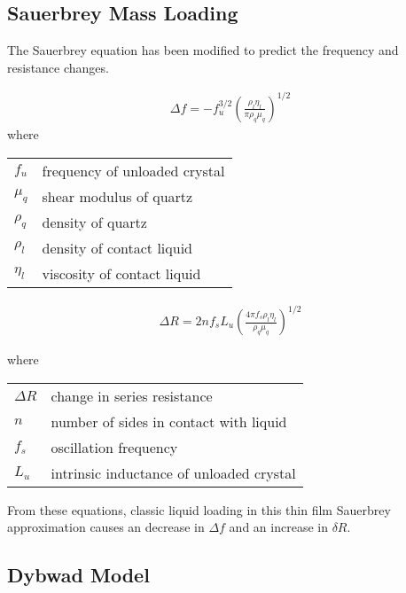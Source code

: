 \documentclass[a4paper]{article}
\begin{document}
\subsection{Sauerbrey Mass Loading}
The Sauerbrey equation has been modified to predict the frequency and
resistance changes.

\begin{align}
  \Delta f = -f_u^{3/2} \left(\frac{\rho_l \eta_l}{\pi \rho_q \mu_q}\right)^{1/2}
\end{align}
where

\begin{tabular}{ll}
  $f_u$    & frequency of unloaded crystal \\
  $\mu_q$  & shear modulus of quartz       \\
  $\rho_q$ & density of quartz             \\
  $\rho_l$ & density of contact liquid     \\
  $\eta_l$ & viscosity of contact liquid
\end{tabular}

\begin{align}
  \Delta R = 2 n f_s L_u \left(\frac{4 \pi f_s \rho_l \eta_l}{\rho_q \mu_q}\right)^{1/2}
\end{align}

where
\begin{tabular}{ll}
  $\Delta R$ & change in series resistance              \\
  $n$        & number of sides in contact with liquid   \\
  $f_s$      & oscillation frequency                    \\
  $L_u$      & intrinsic inductance of unloaded crystal \\
\end{tabular}

From these equations, classic liquid loading in this thin film Sauerbrey
approximation causes an decrease in $\Delta f$ and an increase in $\delta
  R$.

\subsection{Dybwad Model}
\end{document}
